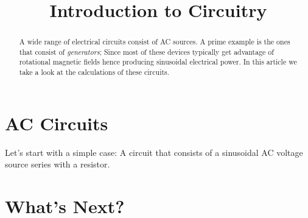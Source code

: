 \documentclass{article}
\begin{document}
	
	\title{Introduction to Circuitry}
	\author{}
	
	\maketitle
	
	\begin{abstract}
	A wide range of electrical circuits consist of AC sources.
	A prime example is the ones that consist of \textit{generators};
	Since most of these devices typically get advantage of rotational magnetic fields hence producing sinusoidal electrical power.
	In this article we take a look at the calculations of these circuits.
	\end{abstract}
	
	\section{AC Circuits}
	Let's start with a simple case: A circuit that consists of a sinusoidal AC voltage source series with a resistor.
		

	\section{What's Next?}

	
\end{document}
